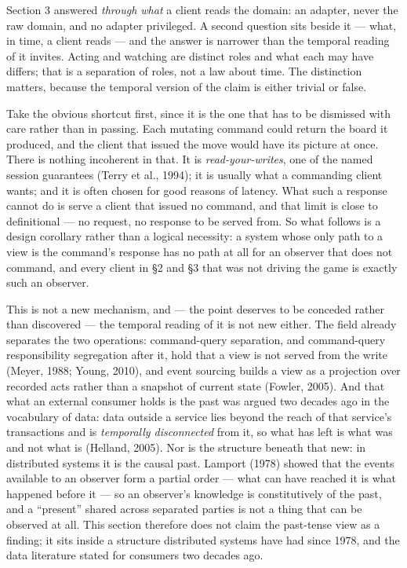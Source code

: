 \documentclass[
]{article}
\begin{document}
Section 3 answered \emph{through what} a client reads the domain: an
adapter, never the raw domain, and no adapter privileged. A second
question sits beside it --- what, in time, a client reads --- and the
answer is narrower than the temporal reading of it invites. Acting and
watching are distinct roles and what each may have differs; that is a
separation of roles, not a law about time. The distinction matters,
because the temporal version of the claim is either trivial or false.

Take the obvious shortcut first, since it is the one that has to be
dismissed with care rather than in passing. Each mutating command could
return the board it produced, and the client that issued the move would
have its picture at once. There is nothing incoherent in that. It is
\emph{read-your-writes}, one of the named session guarantees (Terry et
al., 1994); it is usually what a commanding client wants; and it is
often chosen for good reasons of latency. What such a response cannot do
is serve a client that issued no command, and that limit is close to
definitional --- no request, no response to be served from. So what
follows is a design corollary rather than a logical necessity: a system
whose only path to a view is the command's response has no path at all
for an observer that does not command, and every client in §2 and §3
that was not driving the game is exactly such an observer.

This is not a new mechanism, and --- the point deserves to be conceded
rather than discovered --- the temporal reading of it is not new either.
The field already separates the two operations: command-query
separation, and command-query responsibility segregation after it, hold
that a view is not served from the write (Meyer, 1988; Young, 2010), and
event sourcing builds a view as a projection over recorded acts rather
than a snapshot of current state (Fowler, 2005). And that what an
external consumer holds is the past was argued two decades ago in the
vocabulary of data: data outside a service lies beyond the reach of that
service's transactions and is \emph{temporally disconnected} from it, so
what has left is what was and not what is (Helland, 2005). Nor is the
structure beneath that new: in distributed systems it is the causal
past. Lamport (1978) showed that the events available to an observer
form a partial order --- what can have reached it is what happened
before it --- so an observer's knowledge is constitutively of the past,
and a ``present'' shared across separated parties is not a thing that
can be observed at all. This section therefore does not claim the
past-tense view as a finding; it sits inside a structure distributed
systems have had since 1978, and the data literature stated for
consumers two decades ago.
\end{document}
